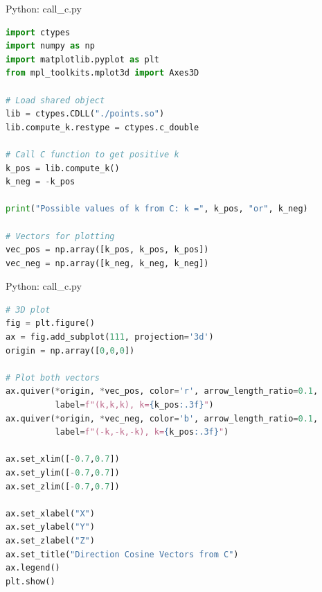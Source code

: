 \documentclass{beamer}
\numberwithin{equation}{section}
\begin{document}
\begin{frame}[fragile]{Python: call\_c.py}
\begin{lstlisting}[language=Python]
import ctypes
import numpy as np
import matplotlib.pyplot as plt
from mpl_toolkits.mplot3d import Axes3D

# Load shared object
lib = ctypes.CDLL("./points.so")
lib.compute_k.restype = ctypes.c_double

# Call C function to get positive k
k_pos = lib.compute_k()
k_neg = -k_pos

print("Possible values of k from C: k =", k_pos, "or", k_neg)

# Vectors for plotting
vec_pos = np.array([k_pos, k_pos, k_pos])
vec_neg = np.array([k_neg, k_neg, k_neg])
\end{lstlisting}
\end{frame}
\begin{frame}[fragile]{Python: call\_c.py}
\begin{lstlisting}[language=Python]
# 3D plot
fig = plt.figure()
ax = fig.add_subplot(111, projection='3d')
origin = np.array([0,0,0])

# Plot both vectors
ax.quiver(*origin, *vec_pos, color='r', arrow_length_ratio=0.1,
          label=f"(k,k,k), k={k_pos:.3f}")
ax.quiver(*origin, *vec_neg, color='b', arrow_length_ratio=0.1,
          label=f"(-k,-k,-k), k={k_pos:.3f}")

ax.set_xlim([-0.7,0.7])
ax.set_ylim([-0.7,0.7])
ax.set_zlim([-0.7,0.7])

ax.set_xlabel("X")
ax.set_ylabel("Y")
ax.set_zlabel("Z")
ax.set_title("Direction Cosine Vectors from C")
ax.legend()
plt.show()
\end{lstlisting}
\end{frame}
\end{document}
